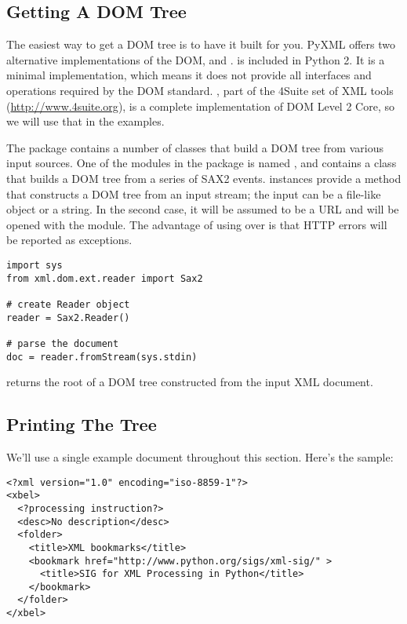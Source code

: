 \documentclass{howto}
\begin{document}
\subsection{Getting A DOM Tree}

The easiest way to get a DOM tree is to have it built for you. PyXML
offers two alternative implementations of the DOM,
 and .  is
included in Python 2. It is a minimal implementation, which means it
does not provide all interfaces and operations required by the DOM
standard.  , part of the 4Suite set of XML tools
(\url{http://www.4suite.org}), is a complete implementation of
DOM Level 2 Core, so we will use that in the examples.

The  package contains a number of classes
that build a DOM tree from various input sources.  One of the modules
in the  package is named , and contains a
 class that builds a DOM tree from a series of SAX2
events.   instances provide a 
method that constructs a DOM tree from an input stream; the input can
be a file-like object or a string.  In the second case, it will be
assumed to be a URL and will be opened with the 
module. The advantage of using  over  is that
HTTP errors will be reported as exceptions. 

\begin{verbatim}
import sys
from xml.dom.ext.reader import Sax2

# create Reader object
reader = Sax2.Reader()

# parse the document
doc = reader.fromStream(sys.stdin)
\end{verbatim}

 returns the root of a DOM tree constructed from
the input XML document.


\subsection{Printing The Tree}

We'll use a single example document throughout this section.  Here's
the sample:

\begin{verbatim}
<?xml version="1.0" encoding="iso-8859-1"?>
<xbel>  
  <?processing instruction?>
  <desc>No description</desc>
  <folder>
    <title>XML bookmarks</title>
    <bookmark href="http://www.python.org/sigs/xml-sig/" >
      <title>SIG for XML Processing in Python</title>
    </bookmark>
  </folder>
</xbel>
\end{verbatim}
\end{document}
